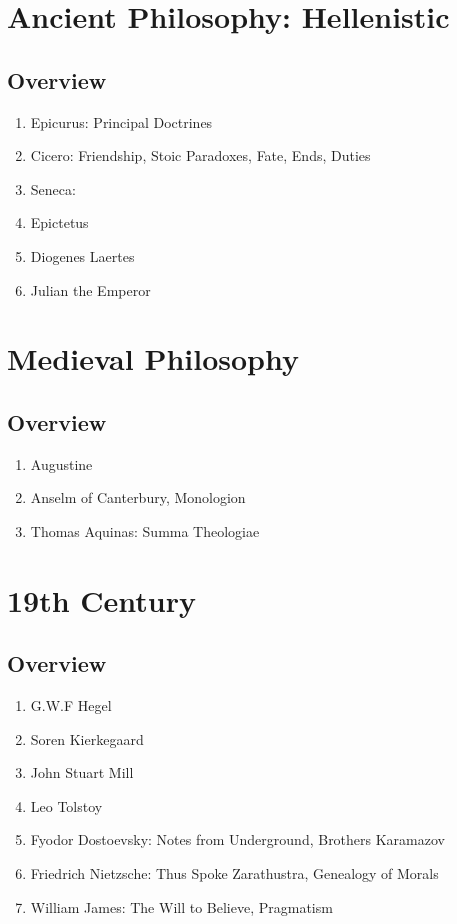 \documentclass{article}
\begin{document}
\section{Ancient Philosophy: Hellenistic}

\subsection{Overview}%
\label{sub:Overview}

\begin{enumerate}
    \item Epicurus: Principal Doctrines
    \item Cicero: Friendship, Stoic Paradoxes, Fate, Ends, Duties
    \item Seneca:
    \item Epictetus
    \item Diogenes Laertes
    \item Julian the Emperor
\end{enumerate}

\section{Medieval Philosophy}

\subsection{Overview}%
\label{sub:Overview}

\begin{enumerate}
    \item Augustine
    \item Anselm of Canterbury, Monologion
    \item Thomas Aquinas: Summa Theologiae
\end{enumerate}

\section{19th Century}

\subsection{Overview}%
\label{sub:Overview}

\begin{enumerate}
    \item G.W.F Hegel
    \item Soren Kierkegaard
    \item John Stuart Mill
    \item Leo Tolstoy
    \item Fyodor Dostoevsky: Notes from Underground, Brothers Karamazov
    \item Friedrich Nietzsche: Thus Spoke Zarathustra, Genealogy of Morals
    \item William James: The Will to Believe, Pragmatism
\end{enumerate}
\end{document}
